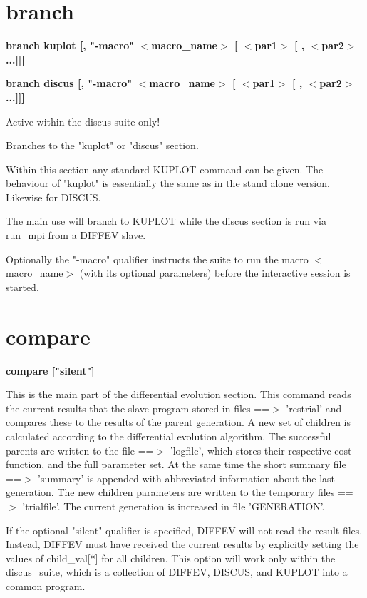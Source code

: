 \section{branch}
{\bf branch kuplot [, "-macro" $ <$macro\_name$> $ [ $ <$par1$> $ [ , $ <$par2$> $ ...]]] \par }
{\bf branch discus [, "-macro" $ <$macro\_name$> $ [ $ <$par1$> $ [ , $ <$par2$> $ ...]]] \par }
\par
\vspace{3pt}
Active within the discus suite only! 
\par
Branches to the "kuplot" or "discus" section. 
\par
Within this section any standard KUPLOT command can be 
given. The behaviour of "kuplot" is essentially the same 
as in the stand alone version. Likewise for DISCUS. 
\par
The main use will branch to KUPLOT while the discus section 
is run via run\_mpi from a DIFFEV slave. 
\par
Optionally the "-macro" qualifier instructs the suite to run the 
macro $ <$macro\_name$> $ (with its optional parameters) before the 
interactive session is started. 
\section{compare}
{\bf compare ["silent"] \par }
\par
\vspace{3pt}
This is the main part of the differential evolution section. 
This command reads the current results that the slave program stored 
in files ==$> $ 'restrial' and compares these to the results of the 
parent generation. A new set of children is calculated according to 
the differential evolution algorithm. The successful parents are 
written to the file ==$> $ 'logfile', which stores their respective cost 
function, and the full parameter set. At the same time the short summary 
file ==$> $ 'summary' is appended with abbreviated information about the 
last generation.  The new children parameters are 
written to the temporary files ==$> $ 'trialfile'. The current 
generation is increased in file 'GENERATION'. 
\par
If the optional "silent" qualifier is specified, DIFFEV will not read 
the result files. Instead, DIFFEV must have received the current results 
by explicitly setting the values of child\_val[*] for all children. 
This option will work only within the discus\_suite, which is a 
collection of DIFFEV, DISCUS, and KUPLOT into a common program. 
